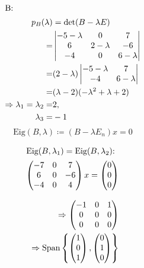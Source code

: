 \documentclass{HM}
\newcommand{\Eig}{\text{Eig}}
\newcommand{\Span}{\text{Span}}
\begin{document}
\begin{enumerate}
		\begin{align*}
			\intertext{B:}
			p_B(\lambda)&=\det(B-\lambda E)\\
			=&\begin{vmatrix}
				-5-\lambda&0&7\\
				6&2-\lambda&-6\\
				-4&0&6-\lambda\\
			\end{vmatrix}\\
			=&(2-\lambda)\begin{vmatrix}
				-5-\lambda&7\\
				-4&6-\lambda\\
			\end{vmatrix}\\
			=&(\lambda-2)(-\lambda^2+\lambda+2)\\
			\Rightarrow\lambda_1=\lambda_2=&2,\\
			\lambda_3=&-1
		\end{align*}
		$$\Eig(B,\lambda)\coloneqq (B-\lambda E_n)x=0$$
		\begin{minipage}{.5\textwidth}
			\begin{align*}
			\intertext{$\Eig(B, \lambda_1)=\Eig(B, \lambda_2)$:}
			\begin{pmatrix}
				-7&0&7\\
				6&0&-6\\
				-4&0&4
			\end{pmatrix}x=\begin{pmatrix}
				0\\0\\0
			\end{pmatrix}\\
			\intertext{}
			\Rightarrow\begin{pmatrix}
				-1&0&1\\
				0&0&0\\
				0&0&0
			\end{pmatrix}\\
			\Rightarrow\Span\left\lbrace\begin{pmatrix}
				1\\
				0\\
				1
			\end{pmatrix},\begin{pmatrix}
				0\\
				1\\
				0
			\end{pmatrix}\right\rbrace
			\end{align*}
		\end{minipage}

\end{enumerate}
\end{document}
